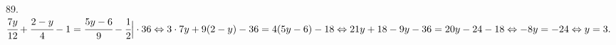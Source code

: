 89. $\cfrac{7y}{12}+\cfrac{2-y}{4}-1=\cfrac{5y-6}{9}-\cfrac{1}{2}\Big|\cdot36\Leftrightarrow
3\cdot7y+9(2-y)-36=4(5y-6)-18\Leftrightarrow
21y+18-9y-36=20y-24-18\Leftrightarrow -8y=-24 \Leftrightarrow y=3.$\\

